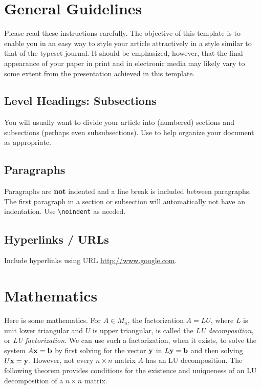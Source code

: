 \section{General Guidelines}

\noindent Please read these instructions carefully.   The objective of this template is to enable you in an easy way to style your article attractively in a style similar to that of the typeset journal. It should be emphasized, however, that the final appearance of your paper in print and in electronic media may likely vary to some extent from the presentation achieved in this template.


\subsection{Level Headings: Subsections}
\noindent You will usually want to divide your article into (numbered) sections and subsections (perhaps even subsubsections).  Use to help organize your document as appropriate.


\subsection{Paragraphs}
\noindent Paragraphs are \textbf{not} indented and a line break is included between paragraphs.  The first paragraph in a section or subsection will automatically  not  have an indentation.  Use \verb!\noindent! as needed.  


\subsection{Hyperlinks / URLs} 
Include hyperlinks using  URL \url{http://www.google.com}.  


\section{Mathematics}\label{sec:lu}
Here is some mathematics.  For $A \in M_n$, the factorization $A = LU$, where $L$ is unit lower triangular and $U$ is upper triangular,  is called the \textit{LU decomposition}, or \textit{LU factorization}.  We can use such a factorization, when it exists, to solve the system $A {\bf x} = {\bf b}$ by first solving for the vector $\bf{y}$ in $L {\bf y} = {\bf b}$ 
and then solving 
$
U {\bf x} = {\bf y}
$. 
However, not every $n \times n$ matrix $A$ has an LU decomposition.  The following theorem provides conditions for the existence and uniqueness of an LU decomposition of a $n \times n$ matrix.

